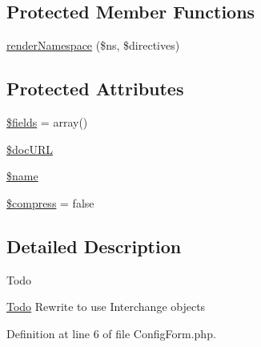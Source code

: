\subsection*{Protected Member Functions}
\begin{DoxyCompactItemize}
\item 
\hyperlink{classHTMLPurifier__Printer__ConfigForm_a46807398e5d113e235f9b66fa1884145}{render\+Namespace} (\$ns, \$directives)
\end{DoxyCompactItemize}
\subsection*{Protected Attributes}
\begin{DoxyCompactItemize}
\item 
\hyperlink{classHTMLPurifier__Printer__ConfigForm_abca6158a6f2327f831ec219859d71b2f}{\$fields} = array()
\item 
\hyperlink{classHTMLPurifier__Printer__ConfigForm_a02e9e17aec27b9667972ff71e990ff55}{\$doc\+U\+R\+L}
\item 
\hyperlink{classHTMLPurifier__Printer__ConfigForm_a387d1ddf6544c4a3521adfce90de9ee0}{\$name}
\item 
\hyperlink{classHTMLPurifier__Printer__ConfigForm_a2ba57d7eb6fe78a607d9b8512cb7579d}{\$compress} = false
\end{DoxyCompactItemize}


\subsection{Detailed Description}
\begin{DoxyRefDesc}{Todo}
\item[\hyperlink{todo__todo000030}{Todo}]Rewrite to use Interchange objects \end{DoxyRefDesc}


Definition at line 6 of file Config\+Form.\+php.



